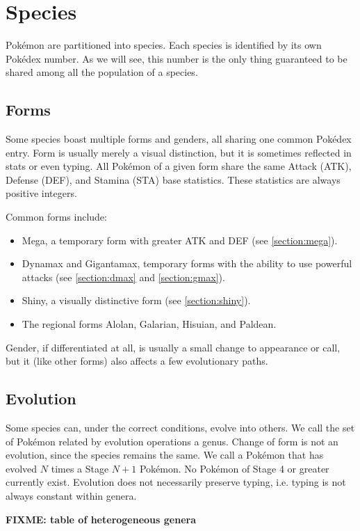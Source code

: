 \chapter{Species}
Pokémon are partitioned into species.
Each species is identified by its own Pokédex number.
As we will see, this number is the only thing guaranteed to be shared
 among all the population of a species.

\section{Forms}
Some species boast multiple forms and genders, all sharing one common Pokédex entry.
Form is usually merely a visual distinction, but it is sometimes reflected
 in stats or even typing.
All Pokémon of a given form share the same Attack (ATK), Defense (DEF), and
 Stamina (STA) base statistics.
These statistics are always positive integers.

Common forms include:
\begin{itemize}
  \item Mega, a temporary form with greater ATK and DEF (see \autoref{section:mega}).
  \item Dynamax and Gigantamax, temporary forms with the ability to use
          powerful attacks (see \autoref{section:dmax} and \autoref{section:gmax}).
  \item Shiny, a visually distinctive form (see \autoref{section:shiny}).
  \item The regional forms Alolan, Galarian, Hisuian, and Paldean.
\end{itemize}
Gender, if differentiated at all, is usually a small change to
 appearance or call, but it (like other forms) also affects a few evolutionary
 paths.

\section{Evolution}
Some species can, under the correct conditions, evolve into others.
We call the set of Pokémon related by evolution operations a genus.
Change of form is not an evolution, since the species remains the same.
We call a Pokémon that has evolved $N$ times a Stage $N+1$ Pokémon.
No Pokémon of Stage 4 or greater currently exist.
Evolution does not necessarily preserve typing, i.e. typing is not always constant within genera.

\textbf{FIXME: table of heterogeneous genera}

